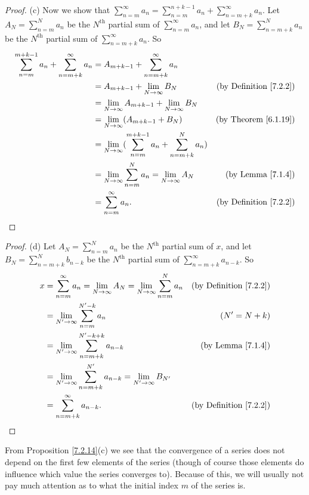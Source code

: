 \begin{proof}{(c)}
Now we show that \(\sum_{n = m}^\infty a_n = \sum_{n = m}^{n + k - 1} a_n + \sum_{n = m + k}^\infty a_n\).
Let \(A_N = \sum_{n = m}^N a_n\) be the \(N^{\text{th}}\) partial sum of \(\sum_{n = m}^\infty a_n\), and let \(B_N = \sum_{n = m + k}^N a_n\) be the \(N^{\text{th}}\) partial sum of \(\sum_{n = m + k}^\infty a_n\).
So
\begin{align*}
\sum_{n = m}^{m + k - 1} a_n + \sum_{n = m + k}^\infty a_n &= A_{m + k - 1} + \sum_{n = m + k}^\infty a_n \\
&= A_{m + k - 1} + \lim_{N \to \infty} B_N & \text{(by Definition \ref{7.2.2})} \\
&= \lim_{N \to \infty} A_{m + k - 1} + \lim_{N \to \infty} B_N \\
&= \lim_{N \to \infty} (A_{m + k - 1} + B_N) & \text{(by Theorem \ref{6.1.19})} \\
&= \lim_{N \to \infty} (\sum_{n = m}^{m + k - 1} a_n + \sum_{n = m + k}^N a_n) \\
&= \lim_{N \to \infty} \sum_{n = m}^N a_n = \lim_{N \to \infty} A_N & \text{(by Lemma \ref{7.1.4})} \\
&= \sum_{n = m}^\infty a_n. & \text{(by Definition \ref{7.2.2})}
\end{align*}
\end{proof}

\begin{proof}{(d)}
Let \(A_N = \sum_{n = m}^N a_n\) be the \(N^{\text{th}}\) partial sum of \(x\), and let \(B_N = \sum_{n = m + k}^N b_{n - k}\) be the \(N^{\text{th}}\) partial sum of \(\sum_{n = m + k}^\infty a_{n - k}\).
So
\begin{align*}
x &= \sum_{n = m}^\infty a_n = \lim_{N \to \infty} A_N = \lim_{N \to \infty} \sum_{n = m}^N a_n & \text{(by Definition \ref{7.2.2})} \\
&= \lim_{N' \to \infty} \sum_{n = m}^{N' - k} a_n & (N' = N + k) \\
&= \lim_{N' \to \infty} \sum_{n = m + k}^{N' - k + k} a_{n - k} & \text{(by Lemma \ref{7.1.4})} \\
&= \lim_{N' \to \infty} \sum_{n = m + k}^{N'} a_{n - k} = \lim_{N' \to \infty} B_{N'} \\
&= \sum_{n = m + k}^\infty a_{n - k}. & \text{(by Definition \ref{7.2.2})}
\end{align*}
\end{proof}

\begin{note}
From Proposition \ref{7.2.14}(c) we see that the convergence of a series does not depend on the first few elements of the series
(though of course those elements do influence which value the series converges to).
Because of this, we will usually not pay much attention as to what the initial index \(m\) of the series is.
\end{note}

